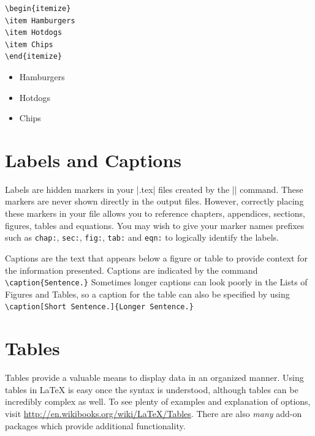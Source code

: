 \begin{minipage}{.45\textwidth}
\begin{Verbatim}
\begin{itemize}
\item Hamburgers
\item Hotdogs
\item Chips
\end{itemize}
\end{Verbatim}
\end{minipage}
\hfill
\begin{minipage}{.45\textwidth}
\begin{itemize}
\item Hamburgers
\item Hotdogs
\item Chips
\end{itemize}
\end{minipage}


\section{Labels and Captions}\label{sec:labels}

Labels are hidden markers in your |.tex| files created by the |\label{name}|
command.  These markers are never shown directly in the output files.  However,
correctly placing these markers in your file allows you to reference chapters,
appendices, sections, figures, tables and equations.  You may wish to give your
marker names prefixes such as \texttt{chap:}, \texttt{sec:}, \texttt{fig:},
\texttt{tab:} and \texttt{eqn:} to logically identify the labels.

Captions are the text that appears below a figure or table to provide context
for the information presented.  Captions are indicated by the command
\verb|\caption{Sentence.}| Sometimes longer captions can look poorly in the
Lists of Figures and Tables, so a caption for the table can also be specified
by using \verb|\caption[Short Sentence.]{Longer Sentence.}|

\section{Tables}

Tables provide a valuable means to display data in an organized manner.  Using
tables in \LaTeX{} is easy once the syntax is understood, although tables can
be incredibly complex as well.  To see plenty of examples and explanation of
options, visit \url{http://en.wikibooks.org/wiki/LaTeX/Tables}. There are also
\emph{many} add-on packages which provide additional functionality.

